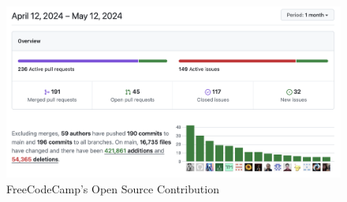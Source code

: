\begin{figure}[ht]
    \includegraphics[width=12cm]{figs/freecodecamp.png}
    \centering
    \caption{FreeCodeCamp's Open Source Contribution}
    \label{fig:freeCodeCamp}
\end{figure}




\clearpage  %
